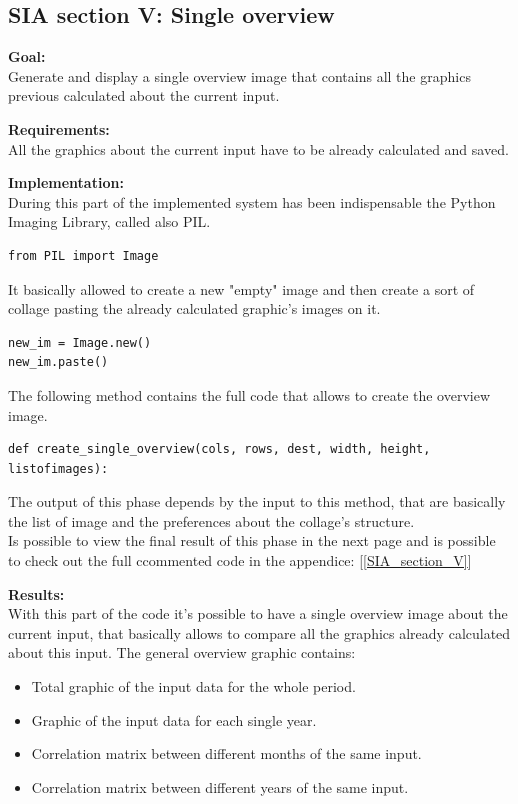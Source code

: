 \newpage
\subsection{SIA section V: Single overview}

\textbf{Goal:}\\
Generate and display a single overview image that contains all the graphics previous calculated about the current input.

\textbf{Requirements:}\\
All the graphics about the current input have to be already calculated and saved.

\textbf{Implementation:}\\
During this part of the implemented system has been indispensable the Python Imaging Library, called also PIL. 
\begin{lstlisting}
from PIL import Image
\end{lstlisting}

It basically allowed to create a new "empty" image and then create a sort of collage pasting the already calculated graphic's images on it.
\begin{lstlisting}
new_im = Image.new()
new_im.paste()
\end{lstlisting}

The following method contains the full code that allows to create the overview image. 
\begin{lstlisting}
def create_single_overview(cols, rows, dest, width, height, listofimages):
\end{lstlisting}
The output of this phase depends by the input to this method, that are basically the list of image and the preferences about the collage's structure.\\
Is possible to view the final result of this phase in the next page and is possible to check out the full ccommented code in the appendice: [\ref{SIA_section_V}]

\newpage

\textbf{Results:}\\
With this part of the code it's possible to have a single overview image about the current input, that basically allows to compare all the graphics already calculated about this input. The general overview graphic contains:
\begin{itemize}
\item Total graphic of the input data for the whole period.
\item Graphic of the input data for each single year.
\item Correlation matrix between different months of the same input.
\item Correlation matrix between different years of the same input.
\end{itemize}

